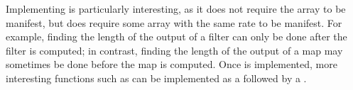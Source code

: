 Implementing \Hs@length@ is particularly interesting, as it does not require the array to be manifest, but does require some array with the same rate to be manifest.
For example, finding the length of the output of a filter can only be done after the filter is computed; in contrast, finding the length of the output of a map may sometimes be done before the map is computed.
Once \Hs@length@ is implemented, more interesting functions such as \Hs@reverse@ can be implemented as a \Hs@generate@ followed by a \Hs@gather@.

% 
 

